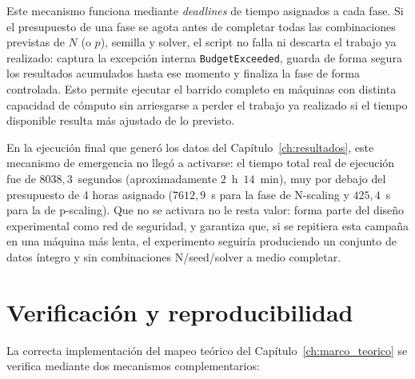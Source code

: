 Este mecanismo funciona mediante \textit{deadlines} de tiempo asignados a cada fase. Si el presupuesto de una fase se agota antes de completar todas las combinaciones previstas de $N$ (o $p$), semilla y solver, el script no falla ni descarta el trabajo ya realizado: captura la excepción interna \texttt{BudgetExceeded}, guarda de forma segura los resultados acumulados hasta ese momento y finaliza la fase de forma controlada. Esto permite ejecutar el barrido completo en máquinas con distinta capacidad de cómputo sin arriesgarse a perder el trabajo ya realizado si el tiempo disponible resulta más ajustado de lo previsto.

En la ejecución final que generó los datos del Capítulo~\ref{ch:resultados}, este mecanismo de emergencia no llegó a activarse: el tiempo total real de ejecución fue de $8038{,}3$~segundos (aproximadamente $2$~h~$14$~min), muy por debajo del presupuesto de 4 horas asignado ($7612{,}9$~s para la fase de N-scaling y $425{,}4$~s para la de p-scaling). Que no se activara no le resta valor: forma parte del diseño experimental como red de seguridad, y garantiza que, si se repitiera esta campaña en una máquina más lenta, el experimento seguiría produciendo un conjunto de datos íntegro y sin combinaciones N/seed/solver a medio completar.

\section{Verificación y reproducibilidad}
\label{sec:verificacion}

La correcta implementación del mapeo teórico del Capítulo~\ref{ch:marco_teorico} se verifica mediante dos mecanismos complementarios:

